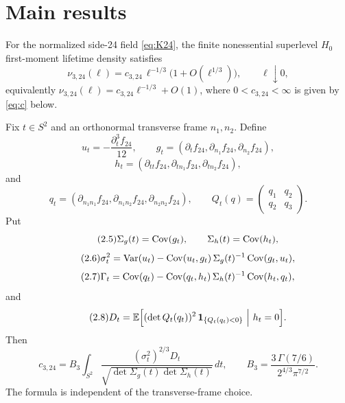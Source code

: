 \section{Main results}\label{sec:results}

\begin{theorem}\label{thm:main}
For the normalized side-24 field \eqref{eq:K24}, the finite nonessential superlevel $H_0$ first-moment lifetime density satisfies
\begin{equation}\tag{2.1}\label{eq:main}
\nu_{3,24}(\ell)=c_{3,24}\,\ell^{-1/3}\bigl(1+O(\ell^{1/3})\bigr),\qquad \ell\downarrow0,
\end{equation}
equivalently $\nu_{3,24}(\ell)=c_{3,24}\ell^{-1/3}+O(1)$, where $0<c_{3,24}<\infty$ is given by \eqref{eq:c} below.

Fix $t\in S^2$ and an orthonormal transverse frame $n_1,n_2$. Define
\begin{equation}\tag{2.2}
u_t=-\frac{\partial_t^3f_{24}}{12},\qquad g_t=(\partial_tf_{24},\partial_{n_1}f_{24},\partial_{n_2}f_{24}),
\end{equation}
\begin{equation}\tag{2.3}
h_t=(\partial_{tt}f_{24},\partial_{tn_1}f_{24},\partial_{tn_2}f_{24}),
\end{equation}
and
\begin{equation}\tag{2.4}
q_t=(\partial_{n_1n_1}f_{24},\partial_{n_1n_2}f_{24},\partial_{n_2n_2}f_{24}),\qquad
Q_t(q)=\begin{pmatrix}q_1&q_2\\ q_2&q_3\end{pmatrix}.
\end{equation}
Put
\begin{equation}\tag{2.5}
\Sigma_g(t)=\operatorname{Cov}(g_t),\qquad \Sigma_h(t)=\operatorname{Cov}(h_t),
\end{equation}
\begin{equation}\tag{2.6}
\sigma_t^2=\operatorname{Var}(u_t)-\operatorname{Cov}(u_t,g_t)\,\Sigma_g(t)^{-1}\operatorname{Cov}(g_t,u_t),
\end{equation}
\begin{equation}\tag{2.7}
\Gamma_t=\operatorname{Cov}(q_t)-\operatorname{Cov}(q_t,h_t)\,\Sigma_h(t)^{-1}\operatorname{Cov}(h_t,q_t),
\end{equation}
and
\begin{equation}\tag{2.8}\label{eq:Dt}
D_t=\E\Bigl[(\det Q_t(q_t))^2\,\ind_{\{Q_t(q_t)<0\}}\ \Big|\ h_t=0\Bigr].
\end{equation}
Then
\begin{equation}\tag{2.9}\label{eq:c}
c_{3,24}=B_3\int_{S^2}\frac{(\sigma_t^2)^{2/3}D_t}{\sqrt{\det\Sigma_g(t)\det\Sigma_h(t)}}\,dt,\qquad B_3=\frac{3\,\Gamma(7/6)}{2^{4/3}\pi^{7/2}} .
\end{equation}
The formula is independent of the transverse-frame choice.


\end{theorem}
